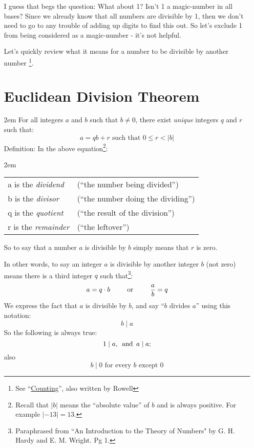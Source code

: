 \documentclass{article}
\newenvironment{jprIn}{\begin{adjustwidth}{2em}{}}{\end{adjustwidth}}
\begin{document}
I guess that begs the question: What about 1? Isn't 1 a magic-number in all bases?
Since we already know that all numbers are divisible by 1,
then we don't need to go to any trouble of adding up digits to find this out.
So let's exclude 1 from being considered as a magic-number - it's not helpful.

Let's quickly review what it means for a number to be divisible 
by another number
\footnote{See ``\href {https://dl.dropboxusercontent.com/u/2157321/basisReprThm.pdf} {Counting}'', also written by Rowell}.

\section*{Euclidean Division Theorem}
\begin{jprIn}
For all integers $a$ and $b$ such that $b\ne0$,
there exist \emph{unique} integers $q$ and $r$ such that:
\[a=qb+r  \text{ such that } 0\le{}r<\lvert{}b\rvert\]
Definition: In the above equation\footnote{Recall
that $\lvert{}b\rvert$ means the ``absolute value'' of $b$ and is always positive. For
example $\lvert{}{-13}\rvert = 13$.}:
\begin{jprIn}
\begin{tabular}{l l}
a is the \emph{dividend} & (``the number being divided'')\\
b is the \emph{divisor} & (``the number doing the dividing'')\\
q is the \emph{quotient} & (``the result of the division'')\\
r is the \emph{remainder} & (``the leftover'')
\end{tabular}
\end{jprIn}
\end{jprIn}

So to say that a number $a$ is divisible by $b$ simply means that $r$ is zero.

In other words, to say an integer $a$ is divisible by another integer $b$
(not zero) means there is a third integer $q$ such that\footnote{Paraphrased
from ``An Introduction to the Theory of Numbers" by G. H. Hardy
and E. M. Wright. Pg 1.}:
\[a=q\cdot{}b\text{\hspace{2.5em}or\hspace{2.5em}}\frac{a}{b}=q\]
We express the fact that $a$ is divisible by $b$, and say
``$b$ divides $a$'' using this notation:
\[b\mid{}a\]
So the following is always true:
\[1\mid{}a,
\text{\hspace{0.5em}and\hspace{0.5em}}a\mid{}a;\]
also
\[b\mid{}0\text{ for every }b\text{ except }0\]
%
\end{document}
